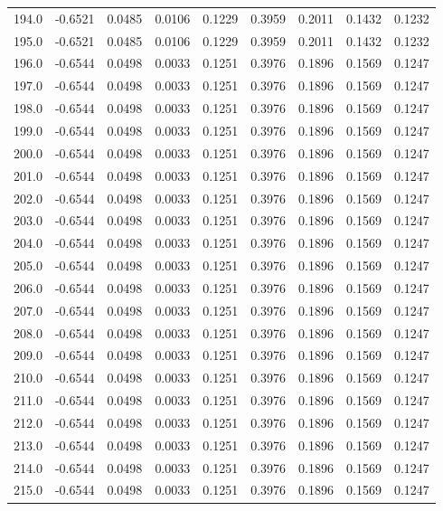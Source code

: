 \begin{longtable}{lrrrrrrrr}
194.0 & -0.6521 & 0.0485 & 0.0106 & 0.1229 & 0.3959 & 0.2011 & 0.1432 & 0.1232 \\
195.0 & -0.6521 & 0.0485 & 0.0106 & 0.1229 & 0.3959 & 0.2011 & 0.1432 & 0.1232 \\
196.0 & -0.6544 & 0.0498 & 0.0033 & 0.1251 & 0.3976 & 0.1896 & 0.1569 & 0.1247 \\
197.0 & -0.6544 & 0.0498 & 0.0033 & 0.1251 & 0.3976 & 0.1896 & 0.1569 & 0.1247 \\
198.0 & -0.6544 & 0.0498 & 0.0033 & 0.1251 & 0.3976 & 0.1896 & 0.1569 & 0.1247 \\
199.0 & -0.6544 & 0.0498 & 0.0033 & 0.1251 & 0.3976 & 0.1896 & 0.1569 & 0.1247 \\
200.0 & -0.6544 & 0.0498 & 0.0033 & 0.1251 & 0.3976 & 0.1896 & 0.1569 & 0.1247 \\
201.0 & -0.6544 & 0.0498 & 0.0033 & 0.1251 & 0.3976 & 0.1896 & 0.1569 & 0.1247 \\
202.0 & -0.6544 & 0.0498 & 0.0033 & 0.1251 & 0.3976 & 0.1896 & 0.1569 & 0.1247 \\
203.0 & -0.6544 & 0.0498 & 0.0033 & 0.1251 & 0.3976 & 0.1896 & 0.1569 & 0.1247 \\
204.0 & -0.6544 & 0.0498 & 0.0033 & 0.1251 & 0.3976 & 0.1896 & 0.1569 & 0.1247 \\
205.0 & -0.6544 & 0.0498 & 0.0033 & 0.1251 & 0.3976 & 0.1896 & 0.1569 & 0.1247 \\
206.0 & -0.6544 & 0.0498 & 0.0033 & 0.1251 & 0.3976 & 0.1896 & 0.1569 & 0.1247 \\
207.0 & -0.6544 & 0.0498 & 0.0033 & 0.1251 & 0.3976 & 0.1896 & 0.1569 & 0.1247 \\
208.0 & -0.6544 & 0.0498 & 0.0033 & 0.1251 & 0.3976 & 0.1896 & 0.1569 & 0.1247 \\
209.0 & -0.6544 & 0.0498 & 0.0033 & 0.1251 & 0.3976 & 0.1896 & 0.1569 & 0.1247 \\
210.0 & -0.6544 & 0.0498 & 0.0033 & 0.1251 & 0.3976 & 0.1896 & 0.1569 & 0.1247 \\
211.0 & -0.6544 & 0.0498 & 0.0033 & 0.1251 & 0.3976 & 0.1896 & 0.1569 & 0.1247 \\
212.0 & -0.6544 & 0.0498 & 0.0033 & 0.1251 & 0.3976 & 0.1896 & 0.1569 & 0.1247 \\
213.0 & -0.6544 & 0.0498 & 0.0033 & 0.1251 & 0.3976 & 0.1896 & 0.1569 & 0.1247 \\
214.0 & -0.6544 & 0.0498 & 0.0033 & 0.1251 & 0.3976 & 0.1896 & 0.1569 & 0.1247 \\
215.0 & -0.6544 & 0.0498 & 0.0033 & 0.1251 & 0.3976 & 0.1896 & 0.1569 & 0.1247 \\

\end{longtable}
